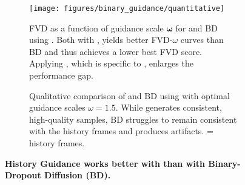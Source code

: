 \begin{figure}[t]
    \begin{subfigure}[t]{0.49\textwidth}
        \centering
        \texttt{[image: figures/binary\_guidance/quantitative]}
        \vskip -0.02in
        \caption{
            FVD as a function of guidance scale $\boldsymbol{\omega}$ for \mtd and BD using \HG. Both with \HGv, \mtd yields better FVD-$\omega$ curves than BD and thus achieves a lower best FVD score. Applying \HGf, which is specific to \mtd, enlarges the performance gap.
        }
        \label{fig:binary_guidance_quantitative}
    \end{subfigure}
    \hfill
    \begin{subfigure}[t]{0.49\textwidth}
        \vskip -0.02in
        \caption{
            Qualitative comparison of \mtd and BD using \HGv with optimal guidance scales $\omega = 1.5$. While \mtd generates consistent, high-quality samples, BD struggles to remain consistent with the history frames and produces artifacts. \textcolor{red}{\setlength{\fboxsep}{1.5pt}\textcolor{red}{\fbox{\textcolor{black}{Red box}}}} = history frames.
        }
        \label{fig:binary_guidance_qualitative}
    \end{subfigure}
    \vskip -0.05in
    \caption{
        \textbf{History Guidance works better with \mtd than with Binary-Dropout Diffusion (BD).}
    }
    \label{fig:binary_guidance}
    \vskip -0.1in
\end{figure}
